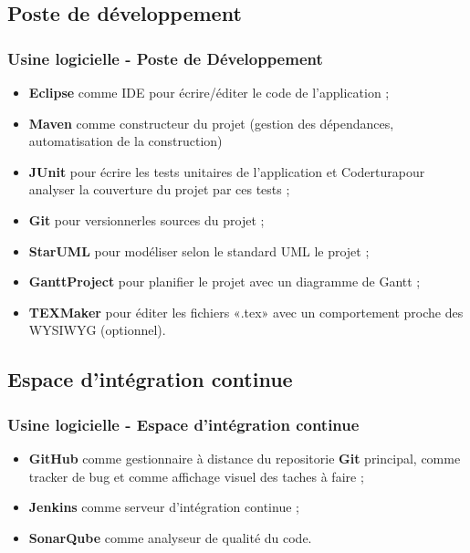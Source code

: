 \documentclass{beamer}
\begin{document}
\subsection{Poste de développement}
\begin{frame}[label=posteDeveloppement]
  \frametitle{Usine logicielle - Poste de Développement}
  \begin{itemize}
  \item \textbf{Eclipse} comme IDE pour écrire/éditer le code de l'application ;
  \item \textbf{Maven} comme constructeur du projet (gestion des dépendances, automatisation de la construction)
  \item \textbf{JUnit} pour écrire les tests unitaires de l'application et Coderturapour analyser la couverture du projet par ces tests ;
  \item \textbf{Git} pour versionnerles sources du projet ;
  \item \textbf{StarUML} pour modéliser selon le standard UML le projet ;
  \item \textbf{GanttProject} pour planifier le projet avec un diagramme de Gantt ;
  \item \textbf{TEXMaker} pour éditer les fichiers «.tex» avec un comportement proche des WYSIWYG (optionnel).
\end{itemize}  
\end{frame}

\subsection{Espace d'intégration continue}
\begin{frame}[label=integrationContinue]
  \frametitle{Usine logicielle - Espace d’intégration continue}
  \begin{itemize}
  \item \textbf{GitHub} comme gestionnaire à distance du repositorie \textbf{Git} principal, comme tracker de bug et comme affichage visuel des taches à faire ;
  \item \textbf{Jenkins} comme serveur d'intégration continue ;
  \item \textbf{SonarQube} comme analyseur de qualité du code.
  \end{itemize}
\end{frame}
\end{document}
